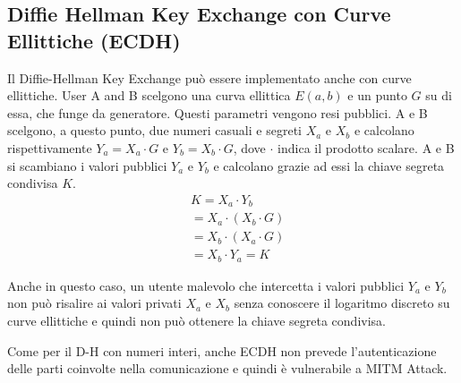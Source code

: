 \subsection{Diffie Hellman Key Exchange con Curve Ellittiche (ECDH)}
\label{cap:ecdh}

Il Diffie-Hellman Key Exchange può essere implementato anche con curve ellittiche.
User A and B scelgono una curva ellittica $E(a,b)$ e un punto $G$ su di essa, che funge da generatore. Questi parametri vengono resi pubblici.
A e B scelgono, a questo punto, due numeri casuali e segreti $X_a$ e $X_b$ e calcolano rispettivamente $Y_a = X_a \cdot G$ e $Y_b = X_b \cdot G$, dove $\cdot$ indica il prodotto scalare.
A e B si scambiano i valori pubblici $Y_a$ e $Y_b$ e calcolano grazie ad essi la chiave segreta condivisa $K$.
\begin{equation}
	\begin{aligned}
		&K = X_a \cdot Y_b\\
		&= X_a \cdot (X_b \cdot G)\\
		&= X_b \cdot (X_a \cdot G)\\
		&= X_b \cdot Y_a = K
	\end{aligned}
\end{equation}

Anche in questo caso, un utente malevolo che intercetta i valori pubblici $Y_a$ e $Y_b$ non può risalire ai valori privati $X_a$ e $X_b$ senza conoscere il logaritmo discreto su curve ellittiche e quindi non può ottenere la chiave segreta condivisa.

Come per il D-H con numeri interi, anche ECDH non prevede l'autenticazione delle parti coinvolte nella comunicazione e quindi è vulnerabile a MITM Attack.
